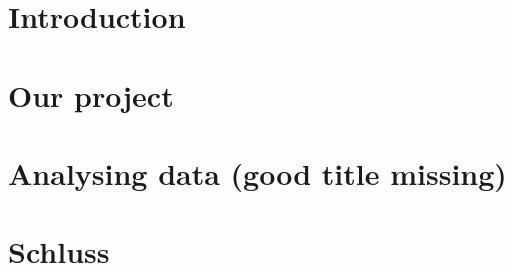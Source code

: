 \chapter{Introduction}
	
	
\chapter{Our project}
	
	
	
		
\chapter{Analysing data (good title missing)}

	
					
		
\chapter{Schluss}

	
		
		
%	

